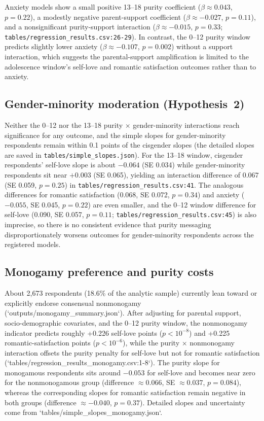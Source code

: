 \documentclass[12pt]{article}
\begin{document}
Anxiety models show a small positive 13--18 purity coefficient ($\beta \approx 0.043$, $p=0.22$), a modestly negative parent-support coefficient ($\beta \approx -0.027$, $p=0.11$), and a nonsignificant purity-support interaction ($\beta \approx -0.015$, $p=0.33$; \texttt{tables/regression\_results.csv:26-29}). In contrast, the 0--12 purity window predicts slightly lower anxiety ($\beta \approx -0.107$, $p=0.002$) without a support interaction, which suggests the parental-support amplification is limited to the adolescence window’s self-love and romantic satisfaction outcomes rather than to anxiety.

\subsection{Gender-minority moderation (Hypothesis~2)}
Neither the 0--12 nor the 13--18 purity × gender-minority interactions reach significance for any outcome, and the simple slopes for gender-minority respondents remain within 0.1 points of the cisgender slopes (the detailed slopes are saved in \texttt{tables/simple\_slopes.json}). For the 13--18 window, cisgender respondents’ self-love slope is about $-0.064$ (SE 0.034) while gender-minority respondents sit near $+0.003$ (SE 0.065), yielding an interaction difference of $0.067$ (SE 0.059, $p=0.25$) in \texttt{tables/regression\_results.csv:41}. The analogous differences for romantic satisfaction ($0.068$, SE 0.072, $p=0.34$) and anxiety ($-0.055$, SE 0.045, $p=0.22$) are even smaller, and the 0--12 window difference for self-love (0.090, SE 0.057, $p=0.11$; \texttt{tables/regression\_results.csv:45}) is also imprecise, so there is no consistent evidence that purity messaging disproportionately worsens outcomes for gender-minority respondents across the registered models.

\subsection{Monogamy preference and purity costs}
About 2,673 respondents (18.6\% of the analytic sample) currently lean toward or explicitly endorse consensual nonmonogamy (`outputs/monogamy\_summary.json`). After adjusting for parental support, socio-demographic covariates, and the 0--12 purity window, the nonmonogamy indicator predicts roughly +0.226 self-love points ($p<10^{-8}$) and +0.225 romantic-satisfaction points ($p<10^{-6}$), while the purity × nonmonogamy interaction offsets the purity penalty for self-love but not for romantic satisfaction (`tables/regression\_results\_monogamy.csv:1-8`). The purity slope for monogamous respondents sits around $-0.053$ for self-love and becomes near zero for the nonmonogamous group (difference $\approx 0.066$, SE $\approx 0.037$, $p=0.084$), whereas the corresponding slopes for romantic satisfaction remain negative in both groups (difference $\approx -0.040$, $p=0.37$). Detailed slopes and uncertainty come from `tables/simple\_slopes\_monogamy.json`.
\end{document}
